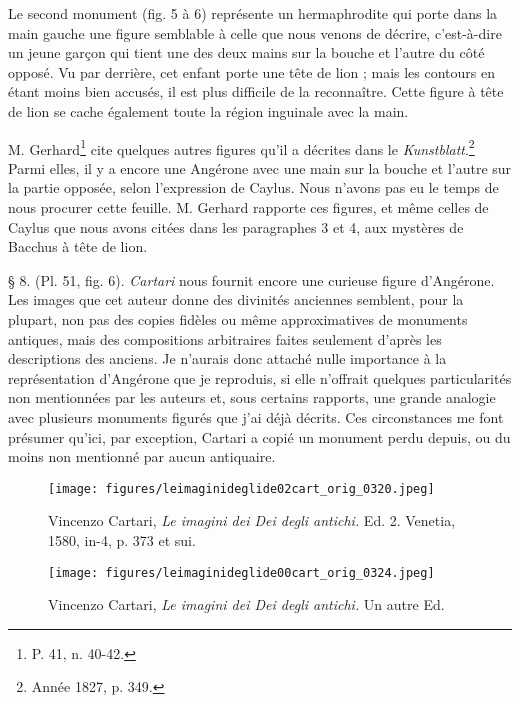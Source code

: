 \documentclass[a4paper, 11pt, oneside, polutonikogreek, french]{article}
\begin{document}
Le second monument (fig. 5 à 6) représente un hermaphrodite qui porte dans la main gauche une figure semblable à celle que nous venons de décrire, c'est-à-dire un jeune garçon qui tient une des deux mains sur la bouche et l'autre du côté opposé. Vu par derrière, cet enfant porte une tête de lion ; mais les contours en étant moins bien accusés, il est plus difficile de la reconnaître. Cette figure à tête de lion se cache également toute la région inguinale avec la main.

M. Gerhard\footnote{P. 41, n. 40-42.} cite quelques autres figures qu'il a décrites dans le \emph{Kunstblatt}.\footnote{Année 1827, p. 349.} Parmi elles, il y a encore une Angérone avec une main sur la bouche et l'autre sur la partie opposée, selon l'expression de Caylus. Nous n'avons pas eu le temps de nous procurer cette feuille. M. Gerhard rapporte ces figures, et même celles de Caylus que nous avons citées dans les paragraphes 3 et 4, aux mystères de Bacchus à tête de lion.

§ 8. (Pl. 51, fig. 6). \emph{Cartari} nous fournit encore une curieuse figure d'Angérone. Les images que cet auteur donne des divinités anciennes semblent, pour la plupart, non pas des copies fidèles ou même approximatives de monuments antiques, mais des compositions arbitraires faites seulement d'après les descriptions des anciens. Je n'aurais donc attaché nulle importance à la représentation d'Angérone que je reproduis, si elle n'offrait quelques particularités non mentionnées par les auteurs et, sous certains rapports, une grande analogie avec plusieurs monuments figurés que j'ai déjà décrits. Ces circonstances me font présumer qu'ici, par exception, Cartari a copié un monument perdu depuis, ou du moins non mentionné par aucun antiquaire.
\clearpage
\vspace*{\fill}
\begin{figure}[H]
\centering
\texttt{[image: figures/leimaginideglide02cart\_orig\_0320.jpeg]}
\caption{Vincenzo Cartari, \emph{Le imagini dei Dei degli antichi.} Ed. 2. Venetia, 1580, in-4, p. 373 et sui.}
\end{figure}
\vspace*{\fill}
\clearpage
\vspace*{\fill}
\begin{figure}[H]
\centering
\texttt{[image: figures/leimaginideglide00cart\_orig\_0324.jpeg]}
\caption{Vincenzo Cartari, \emph{Le imagini dei Dei degli antichi.} Un autre Ed.}
\end{figure}
\vspace*{\fill}
\clearpage
\end{document}
